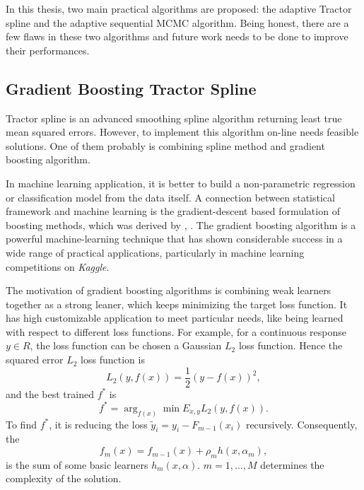 
In this thesis, two main practical algorithms are proposed: the adaptive Tractor spline and the adaptive sequential MCMC algorithm. Being honest, there are a few flaws in these two algorithms and future work needs to be done to improve their performances. 


\subsection*{Gradient Boosting Tractor Spline}

Tractor spline is an advanced smoothing spline algorithm returning least true mean squared errors. However, to implement this algorithm on-line needs feasible solutions. One of them probably is combining spline method and gradient boosting algorithm. 


In machine learning application, it is better to build a non-parametric regression or classification model from the data itself. A connection between statistical framework and machine learning is the gradient-descent based formulation of boosting methods, which was derived by \cite{freund1995desicion}, \cite{friedman2001greedy}. The gradient boosting algorithm is a powerful machine-learning technique that has shown considerable success in a wide range of practical applications, particularly in machine learning competitions on \textit{Kaggle}. 


The motivation of gradient boosting algorithms is combining weak learners together as a strong leaner, which keeps minimizing the target loss function. 
It has high customizable application to meet particular needs, like being learned with respect to different loss functions. For example, for a continuous response $y\in \mathit{R}$, the loss function can be chosen a Gaussian $L_2$ loss function. Hence the squared error $L_2$ loss function is 
\begin{equation*}
L_2(y,f(x)) = \frac{1}{2}\left(y-f(x)\right)^2,
\end{equation*}
and the best trained $f^*$ is 
\begin{equation*}
f^* = \arg_{f(x)}\min E_{x,y}L_2(y,f(x)).
\end{equation*}
To find $f^*$, it is reducing the loss $\tilde{y}_i=y_i-F_{m-1}(x_i)$ recursively. Consequently, the 
\begin{equation*}
f_m(x) = f_{m-1}(x)+ \rho_mh(x,\alpha_m),
\end{equation*}
is the sum of some basic learners $h_m(x,\alpha)$. $m=1,\ldots,M$ determines the complexity of the solution. 


